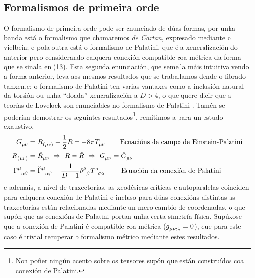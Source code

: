 \subsection{Formalismos de primeira orde} 
O formalismo de primeira orde pode ser enunciado de dúas formas, por unha banda está o formalismo que chamaremos \textit{de Cartan}, expresado mediante o vielbein; e pola outra está o formalismo de Palatini, que é a xeneralización do anterior pero considerando calquera conexión compatible coa métrica da forma que se sinala en (13). Esta segunda enunciación, que semella máis intuitiva vendo a forma anterior, leva aos mesmos resultados que se traballamos dende o fibrado tanxente; o formalismo de Palatini ten varias vantaxes como a inclusión natural da torsión ou unha ``doada'' xeneralización a $D>4$, o que quere dicir que a teorías de Lovelock son enunciables no formalismo de Palatini \cite{Lovelock_metricformulation}. Tamén se poderían demostrar os seguintes resultados\footnote{Non poñer ningún acento sobre os tensores supón que están construídos coa conexión de Palatini.}, remitimos a \cite{clave,Bernal_2017} para un estudo exaustivo,
\begin{align}
    G\indices{_\mu_\nu} &= R\indices{_{(\mu}_{\nu)}}-\frac{1}{2}R = -8\pi T\indices{_\mu_\nu}\hspace{2em}\text{Ecuacións de campo de Einstein-Palatini}\\
    R\indices{_{(\mu}_{\nu)}} &= \breve R\indices{_{\mu}_{\nu}}\ \Rightarrow\ R = \breve R \ \Rightarrow\ G\indices{_{\mu}_{\nu}} = \breve G\indices{_{\mu}_{\nu}}\\
    \Gamma\indices{^\mu_\alpha_\beta}& = \breve\Gamma\indices{^\mu_\alpha_\beta} -\frac{1}{D-1}\delta\indices{^\mu_\beta}T\indices{^\sigma_\sigma_\alpha}
    \hspace{2.206em}\text{Ecuación da conexión de Palatini}
\end{align}
e ademais, a nivel de traxectorias, as xeodésicas críticas e autoparalelas coinciden para calquera conexión de Palatini e incluso para dúas conexións distintas as traxectorias están relacionadas mediante un mero cambio de coordenadas, o que supón que as conexións de Palatini portan unha certa simetría física. Supúxose que a conexión de Palatini é compatible coa métrica ($g\indices{_\mu_\nu_{;\lambda}} = 0$), que para este caso é trivial recuperar o formalismo métrico mediante estes resultados.\\

